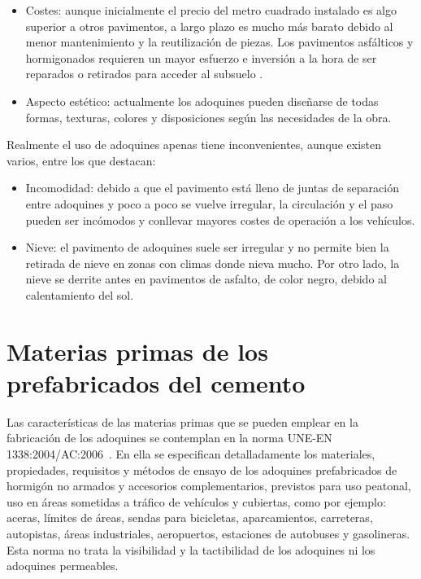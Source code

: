 \begin{itemize}
\item Costes: aunque inicialmente el precio del metro cuadrado instalado es algo superior a otros pavimentos, a largo plazo es mucho más barato debido al menor mantenimiento y la reutilización de piezas. Los pavimentos asfálticos y hormigonados requieren un mayor esfuerzo e inversión a la hora de ser reparados o retirados para acceder al subsuelo \cite{pavimentos,euroadoquin}.

\item Aspecto estético: actualmente los adoquines pueden diseñarse de todas formas, texturas, colores y disposiciones según las necesidades de la obra.
\end{itemize}


Realmente el uso de adoquines apenas tiene inconvenientes, aunque existen varios, entre los que destacan:

\begin{itemize}
  \item Incomodidad: debido a que el pavimento está lleno de juntas de separación entre adoquines y poco a poco se vuelve irregular, la circulación y el paso pueden ser incómodos y conllevar mayores costes de operación a los vehículos.
  \item Nieve: el pavimento de adoquines suele ser irregular y no permite bien la retirada de nieve en zonas con climas donde nieva mucho. Por otro lado, la nieve se derrite antes en pavimentos de asfalto, de color negro, debido al calentamiento del sol.
\end{itemize}

\section{Materias primas de los prefabricados del cemento}
Las características de las materias primas que se pueden emplear en la fabricación de los adoquines se contemplan en la norma UNE-EN 1338:2004/AC:2006 \cite{une1338}. En ella se especifican detalladamente los materiales, propiedades, requisitos y métodos de ensayo de los adoquines prefabricados de hormigón no armados y accesorios complementarios, previstos para uso peatonal, uso en áreas sometidas a tráfico de vehículos y cubiertas, como por ejemplo: aceras, límites de áreas, sendas para bicicletas, aparcamientos, carreteras, autopistas, áreas industriales, aeropuertos, estaciones de autobuses y gasolineras. Esta norma no trata la visibilidad y la tactibilidad de los adoquines ni los adoquines permeables.

